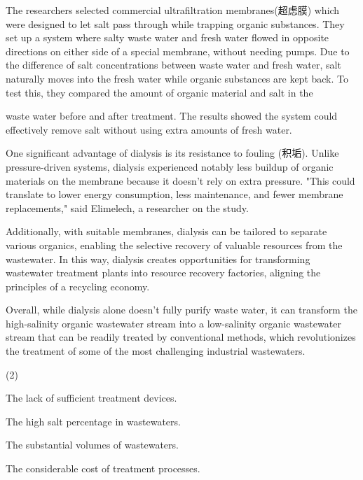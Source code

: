 \documentclass{英语试卷}
\begin{document}
\par The researchers selected commercial ultrafiltration membranes(超虑膜) which were designed to let salt pass through while trapping organic substances. They set up a system where salty waste water and fresh water flowed in opposite directions on either side of a special membrane, without needing pumps. Due to the difference of salt concentrations between waste water and fresh water, salt naturally moves into the fresh water while organic substances are kept back. To test this, they compared the amount of organic material and salt in the\par
\par [图片]\par
\par waste water before and after treatment. The results showed the system could effectively remove salt without using extra amounts of fresh water.\par
\par One significant advantage of dialysis is its resistance to fouling (积垢). Unlike pressure-driven systems, dialysis experienced notably less buildup of organic materials on the membrane because it doesn't rely on extra pressure. "This could translate to lower energy consumption, less maintenance, and fewer membrane replacements," said Elimelech, a researcher on the study.\par
\par Additionally, with suitable membranes, dialysis can be tailored to separate various organics, enabling the selective recovery of valuable resources from the wastewater. In this way, dialysis creates opportunities for transforming wastewater treatment plants into resource recovery factories, aligning the principles of a recycling economy.\par
\par Overall, while dialysis alone doesn't fully purify waste water, it can transform the high-salinity organic wastewater stream into a low-salinity organic wastewater stream that can be readily treated by conventional methods, which revolutionizes the treatment of some of the most challenging industrial wastewaters.\par
{}
\begin{choices}(2)
  \item The lack of sufficient treatment devices.
  \item The high salt percentage in wastewaters.
  \item The substantial volumes of wastewaters.
  \item The considerable cost of treatment processes.
\end{choices}
\end{document}
